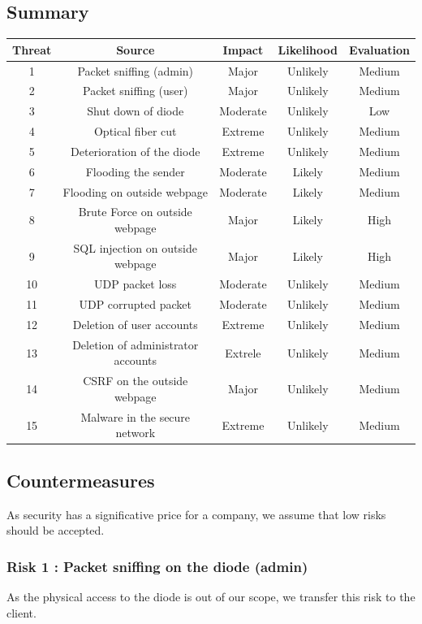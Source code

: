\documentclass[a4paper,11pt]{article}
\begin{document}
\subsection{Summary}
\begin{tabular}{|c|c|c|c|c|}
\hline
Threat & Source & Impact& Likelihood & Evaluation \\
\hline
1 &  Packet sniffing (admin) & Major  & Unlikely & Medium\\
\hline
2 &  Packet sniffing (user)  & Major  & Unlikely & Medium\\
\hline
3 & Shut down of diode & Moderate & Unlikely & Low \\
\hline
4 &  Optical fiber cut & Extreme  & Unlikely & Medium\\
\hline
5 & Deterioration of the diode & Extreme & Unlikely & Medium\\
\hline
6 & Flooding the sender & Moderate & Likely & Medium\\
\hline
7 & Flooding on outside webpage & Moderate & Likely & Medium \\
\hline 
8 &  Brute Force on outside webpage & Major & Likely & High\\
\hline
9 & SQL injection on outside webpage & Major & Likely & High \\
\hline
10 & UDP packet loss & Moderate & Unlikely & Medium \\
\hline
11 & UDP corrupted packet & Moderate & Unlikely & Medium \\
\hline
12 & Deletion of user accounts & Extreme & Unlikely & Medium \\
\hline
13 & Deletion of administrator accounts & Extrele & Unlikely & Medium \\
\hline
14 & CSRF on the outside webpage & Major & Unlikely & Medium \\
\hline
15 & Malware in the secure network & Extreme & Unlikely & Medium \\
\hline

  
\end{tabular}
\subsection{Countermeasures}
\label{sec:countermeasures}
As security has a significative price for a company, we assume that low risks should be accepted.
\subsubsection{Risk 1 : Packet sniffing on the diode (admin) }
As the physical access to the diode is out of our scope, we transfer this risk to the client.
\end{document}

